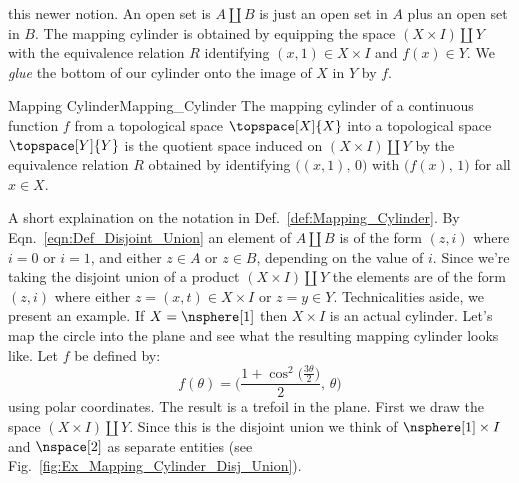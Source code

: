 \documentclass{book}                                                           %
\begin{document}
                this newer notion. An open set is $A\coprod{B}$ is just an open
                set in $A$ plus an open set in $B$. The mapping cylinder is
                obtained by equipping the space $(X\times{I})\coprod{Y}$ with
                the equivalence relation $R$ identifying $(x,1)\in{X}\times{I}$
                and $f(x)\in{Y}$. We \textit{glue} the bottom of our cylinder
                onto the image of $X$ in $Y$ by $f$.
                \begin{fdefinition}{Mapping Cylinder}{Mapping_Cylinder}
                    The mapping cylinder of a continuous function $f$ from a
                    topological space $\topspace[X]{X}$ into a topological space
                    $\topspace[Y]{Y}$ is the quotient space induced on
                    $(X\times{I})\coprod{Y}$ by the equivalence relation $R$
                    obtained by identifying $\big((x,1),\,0\big)$ with
                    $\big(f(x),\,1\big)$ for all $x\in{X}$.
                \end{fdefinition}
                A short explaination on the notation in
                Def.~\ref{def:Mapping_Cylinder}. By
                Eqn.~\ref{eqn:Def_Disjoint_Union} an element of $A\coprod{B}$ is
                of the form $(z,i)$ where $i=0$ or $i=1$, and either $z\in{A}$
                or $z\in{B}$, depending on the value of $i$. Since we're taking
                the disjoint union of a product $(X\times{I})\coprod{Y}$ the
                elements are of the form $(z,i)$ where either
                $z=(x,t)\in{X}\times{I}$ or $z=y\in{Y}$. Technicalities aside,
                we present an example. If $X=\nsphere[1]$ then $X\times{I}$ is
                an actual cylinder. Let's map the circle into the plane and see
                what the resulting mapping cylinder looks like. Let $f$ be
                defined by:
                \begin{equation}
                    \label{eqn:Trefoil_Mapping_Cylinder}%
                    f(\theta)=\Big(
                        \frac{1+\cos^{2}\big(\frac{3\theta}{2}\big)}{2},\,
                        \theta
                    \Big)
                \end{equation}
                using polar coordinates. The result is a trefoil in the plane.
                First we draw the space $(X\times{I})\coprod{Y}$. Since this is
                the disjoint union we think of $\nsphere[1]\times{I}$ and
                $\nspace[2]$ as separate entities
                (see Fig.~\ref{fig:Ex_Mapping_Cylinder_Disj_Union}).
\end{document}

